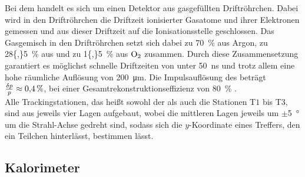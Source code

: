 Bei dem \ot handelt es sich um einen Detektor aus gasgefüllten Driftröhrchen. Dabei wird in den Driftröhrchen die Driftzeit ionisierter Gasatome und ihrer Elektronen gemessen und aus dieser Driftzeit auf die Ionisationsstelle geschlossen. Das Gasgemisch in den Driftröhrchen setzt sich dabei zu \SI{70}{\%} aus Argon, zu \SI{28{,}5}{\%} aus \cotwo  und zu \SI{1{,}5}{\%} aus {\ensuremath{\rm O_2}\xspace}  zusammen. Durch diese Zusammensetzung garantiert es möglichst schnelle Driftzeiten von unter \SI{50}{ns} und trotz allem eine hohe räumliche Auflösung von \SI{200}{\micro m}. Die Impulsauflösung des \ot beträgt $\frac{\delta p}{p}\approx\SI{0{,}4}{\%}$, bei einer Gesamtrekonstruktionseffizienz von \SI{80}{\%} \cite{Alves:2008zz}.\\
Alle Trackingstationen, das heißt sowohl der \ttracker als auch die Stationen T$1$ bis T$3$, sind aus jeweils vier Lagen aufgebaut, wobei die mittleren Lagen jeweils um $\pm$\SI{5}{\degree} um die Strahl-Achse gedreht sind, sodass sich die $y$-Koordinate eines Treffers, den ein Teilchen hinterlässt, bestimmen lässt. 

\subsection{Kalorimeter}

